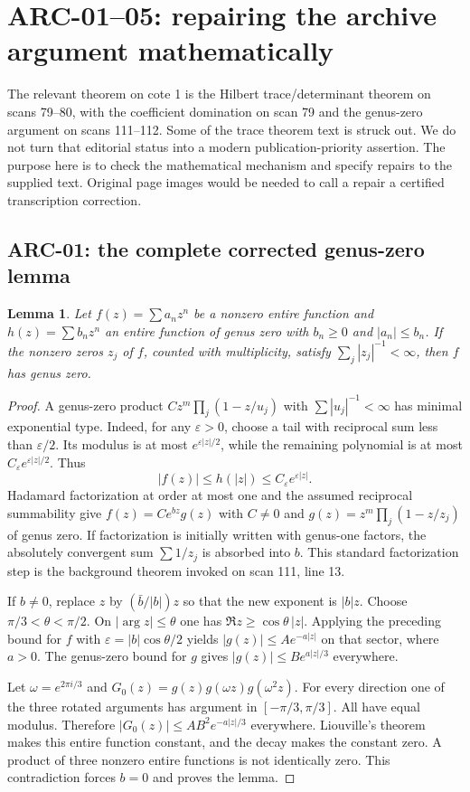 \documentclass[11pt,a4paper]{article}
\newtheorem*{lemma}{Lemma}
\begin{document}
\section{ARC-01--05: repairing the archive argument mathematically}
The relevant theorem on cote 1 is the Hilbert trace/determinant theorem on scans 79--80, with the coefficient domination on scan 79 and the genus-zero argument on scans 111--112. Some of the trace theorem text is struck out. We do not turn that editorial status into a modern publication-priority assertion. The purpose here is to check the mathematical mechanism and specify repairs to the supplied text. Original page images would be needed to call a repair a certified transcription correction.

\subsection{ARC-01: the complete corrected genus-zero lemma}
\begin{lemma}
Let $f(z)=\sum a_nz^n$ be a nonzero entire function and $h(z)=\sum b_nz^n$ an entire function of genus zero with $b_n\ge0$ and $|a_n|\le b_n$. If the nonzero zeros $z_j$ of $f$, counted with multiplicity, satisfy $\sum_j|z_j|^{-1}<\infty$, then $f$ has genus zero.
\end{lemma}
\begin{proof}
A genus-zero product $Cz^m\prod_j(1-z/u_j)$ with $\sum|u_j|^{-1}<\infty$ has minimal exponential type. Indeed, for any $\varepsilon>0$, choose a tail with reciprocal sum less than $\varepsilon/2$. Its modulus is at most $e^{\varepsilon|z|/2}$, while the remaining polynomial is at most $C_\varepsilon e^{\varepsilon|z|/2}$. Thus
\[
 |f(z)|\le h(|z|)\le C_\varepsilon e^{\varepsilon|z|}.
\]
Hadamard factorization \cite[Theorem 3.16, p.~92]{mcmullen} at order at most one and the assumed reciprocal summability give
$f(z)=Ce^{bz}g(z)$ with $C\ne0$ and $g(z)=z^m\prod_j(1-z/z_j)$ of genus zero. If factorization is initially written with genus-one factors, the absolutely convergent sum $\sum1/z_j$ is absorbed into $b$. This standard factorization step is the background theorem invoked on scan 111, line 13.

If $b\ne0$, replace $z$ by $(\bar b/|b|)z$ so that the new exponent is $|b|z$. Choose $\pi/3<\theta<\pi/2$. On $|\arg z|\le\theta$ one has $\Re z\ge\cos\theta\,|z|$. Applying the preceding bound for $f$ with $\varepsilon=|b|\cos\theta/2$ yields $|g(z)|\le A e^{-a|z|}$ on that sector, where $a>0$. The genus-zero bound for $g$ gives $|g(z)|\le B e^{a|z|/3}$ everywhere.

Let $\omega=e^{2\pi i/3}$ and $G_0(z)=g(z)g(\omega z)g(\omega^2z)$. For every direction one of the three rotated arguments has argument in $[-\pi/3,\pi/3]$. All have equal modulus. Therefore $|G_0(z)|\le AB^2e^{-a|z|/3}$ everywhere. Liouville's theorem \cite[Theorem 1.18, p.~19]{mcmullen} makes this entire function constant, and the decay makes the constant zero. A product of three nonzero entire functions is not identically zero. This contradiction forces $b=0$ and proves the lemma.
\end{proof}
\end{document}
